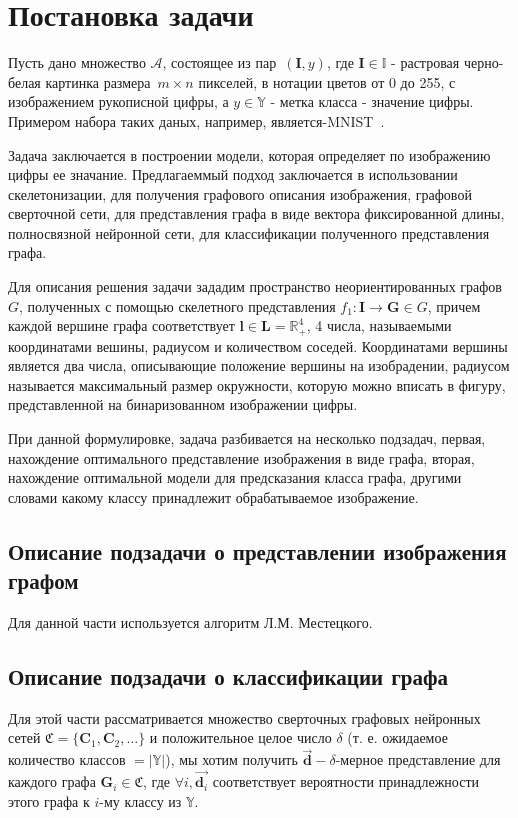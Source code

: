 \documentclass[12pt, twoside]{article}
\begin{document}

\section{Постановка задачи}
Пусть дано множество $\mathcal{A}$, состоящее из пар~$(\mathbf{I}, y)$, где $\mathbf{I} \in \mathbb{I} $ - растровая черно-белая картинка размера~$m\times n$ пикселей, в нотации цветов от 0 до 255, с изображением рукописной цифры, а $y \in \mathbb{Y}$ - метка класса - значение цифры. Примером набора таких даных, например, является-MNIST~\cite{mnist_explanation}. 

Задача заключается в построении модели, которая определяет по изображению цифры ее значание. Предлагаеммый подход заключается в использовании скелетонизации, для получения графового описания изображения, графовой сверточной сети, для представления графа в виде вектора фиксированной длины, полносвязной нейронной сети, для классификации полученного представления графа. 

Для описания решения задачи зададим пространство неориентированных графов~$G$, полученных с помощью скелетного представления $f_1\colon \mathbf{I} \to \mathbf{G} \in G$, причем каждой вершине графа соответствует $\mathbf{l} \in \mathbf{L} = \mathbb{R}^4_+$, 4 числа, называемыми координатами вешины, радиусом и количеством соседей. Координатами вершины является два числа, описывающие положение вершины на изобрадении, радиусом называется максимальный размер окружности, которую можно вписать в фигуру, представленной на бинаризованном изображении цифры.

При данной формулировке, задача разбивается на несколько подзадач, первая, нахождение оптимального представление изображения в виде графа, вторая, нахождение оптимальной модели для предсказания класса графа, другими словами какому классу принадлежит обрабатываемое изображение.
\subsection{Описание подзадачи о представлении изображения графом}
Для данной части используется алгоритм Л.М. Местецкого.
\subsection{Описание подзадачи о классификации графа}
Для этой части рассматривается множество сверточных графовых нейронных сетей $\mathfrak{C} = \{ \mathbf{C}_1, \mathbf{C}_2, \dots\}$ и положительное целое число $\delta$ (т. е. ожидаемое количество классов $= |\mathbb{Y}|$), мы хотим получить  $\overrightarrow{\mathbf{d}} - \delta$-мерное представление для каждого графа $\mathbf{G}_i \in \mathfrak{C}$, где $\forall i, \overrightarrow{\mathbf{d}_i}$ соответствует вероятности принадлежности этого графа к $i$-му классу из $\mathbb{Y}$.
\end{document}
